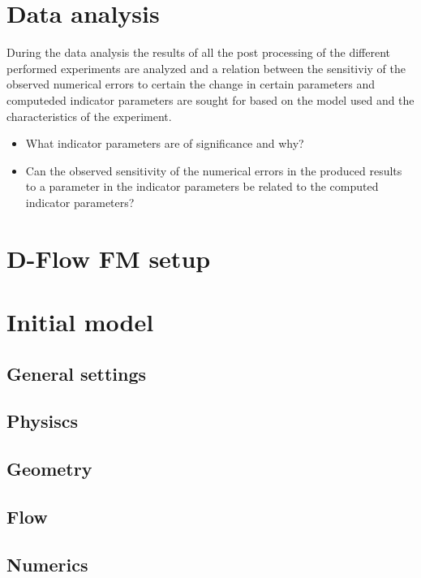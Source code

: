 \section{Data analysis}\label{data-analysis}

During the data analysis the results of all the post processing of the
different performed experiments are analyzed and a relation between the
sensitiviy of the observed numerical errors to certain the change in
certain parameters and computeded indicator parameters are sought for
based on the model used and the characteristics of the experiment.

\begin{itemize}
\tightlist
\item
  What indicator parameters are of significance and why?
\item
  Can the observed sensitivity of the numerical errors in the produced
  results to a parameter in the indicator parameters be related to the
  computed indicator parameters?
\end{itemize}

\section{D-Flow FM setup}\label{d-flow-fm-setup-1}

\section{Initial model}\label{initial-model}

\subsection{General settings}\label{general-settings}

\subsection{Physiscs}\label{physiscs}

\subsection{Geometry}\label{geometry}

\subsection{Flow}\label{flow}

\subsection{Numerics}\label{numerics}

